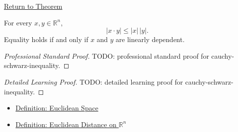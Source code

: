 \newpage
{}
\label{prf:cauchy-schwarz-inequality}

\begin{remark*}[Return]
\hyperref[thm:cauchy-schwarz-inequality]{Return to Theorem}
\end{remark*}

\begin{theorem*}
For every \(x,y\in\mathbb{R}^n\),
\[
  |x\cdot y|\leq |x|\,|y|.
\]
Equality holds if and only if \(x\) and \(y\) are linearly dependent.
\end{theorem*}

\begin{proof}[Professional Standard Proof]
\LRAProofBodyStart
TODO: professional standard proof for cauchy-schwarz-inequality.
\end{proof}

\begin{proof}[Detailed Learning Proof]
\LRAProofBodyStart
TODO: detailed learning proof for cauchy-schwarz-inequality.
\end{proof}

\begin{remark*}
\end{remark*}

\begin{dependencies}
\begin{itemize}
  \item \hyperref[def:euclidean-space]{Definition: Euclidean Space}
  \item \hyperref[def:euclidean-distance-rn]{Definition: Euclidean Distance on \(\mathbb{R}^n\)}
\end{itemize}
\end{dependencies}

\clearpage

